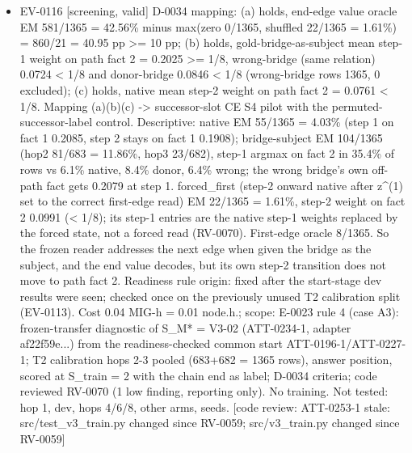 \documentclass[11pt]{article}
\begin{document}
\begin{itemize}
\item EV-0116 [screening, valid] D-0034 mapping: (a) holds, end-edge value oracle EM 581/1365 = 42.56\% minus max(zero 0/1365, shuffled 22/1365 = 1.61\%) = 860/21 = 40.95 pp \textgreater{}= 10 pp; (b) holds, gold-bridge-as-subject mean step-1 weight on path fact 2 = 0.2025 \textgreater{}= 1/8, wrong-bridge (same relation) 0.0724 \textless{} 1/8 and donor-bridge 0.0846 \textless{} 1/8 (wrong-bridge rows 1365, 0 excluded); (c) holds, native mean step-2 weight on path fact 2 = 0.0761 \textless{} 1/8. Mapping (a)(b)(c) -\textgreater{} successor-slot CE S4 pilot with the permuted-successor-label control. Descriptive: native EM 55/1365 = 4.03\% (step 1 on fact 1 0.2085, step 2 stays on fact 1 0.1908); bridge-subject EM 104/1365 (hop2 81/683 = 11.86\%, hop3 23/682), step-1 argmax on fact 2 in 35.4\% of rows vs 6.1\% native, 8.4\% donor, 6.4\% wrong; the wrong bridge's own off-path fact gets 0.2079 at step 1. forced\_first (step-2 onward native after z\textasciicircum{}(1) set to the correct first-edge read) EM 22/1365 = 1.61\%, step-2 weight on fact 2 0.0991 (\textless{} 1/8); its step-1 entries are the native step-1 weights replaced by the forced state, not a forced read (RV-0070). First-edge oracle 8/1365. So the frozen reader addresses the next edge when given the bridge as the subject, and the end value decodes, but its own step-2 transition does not move to path fact 2. Readiness rule origin: fixed after the start-stage dev results were seen; checked once on the previously unused T2 calibration split (EV-0113). Cost 0.04 MIG-h = 0.01 node.h.; scope: E-0023 rule 4 (case A3): frozen-transfer diagnostic of S\_M* = V3-02 (ATT-0234-1, adapter af22f59e...) from the readiness-checked common start ATT-0196-1/ATT-0227-1; T2 calibration hops 2-3 pooled (683+682 = 1365 rows), answer position, scored at S\_train = 2 with the chain end as label; D-0034 criteria; code reviewed RV-0070 (1 low finding, reporting only). No training. Not tested: hop 1, dev, hops 4/6/8, other arms, seeds. [code review: ATT-0253-1 stale: src/test\_v3\_train.py changed since RV-0059; src/v3\_train.py changed since RV-0059]

\end{itemize}
\end{document}
